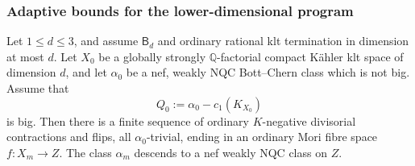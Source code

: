 \subsubsection{Adaptive bounds for the lower-dimensional program}

\begin{lemma}
\label{repair:lem:adaptive-nqc-program}
Let $1\leq d\leq3$, and assume $\mathsf B_d$ and ordinary rational
klt termination in dimension at most $d$. Let $X_0$ be a globally
strongly $\mathbb Q$-factorial compact K\"ahler klt space of dimension
$d$, and let $\alpha_0$ be a nef, weakly NQC Bott--Chern class which
is not big. Assume that
\[
                         Q_0:=\alpha_0-c_1(K_{X_0})
\]
is big. Then there is a finite sequence of ordinary $K$-negative
divisorial contractions and flips, all $\alpha_0$-trivial, ending in
an ordinary Mori fibre space $f:X_m\to Z$. The class $\alpha_m$
descends to a nef weakly NQC class on $Z$.
\end{lemma}

